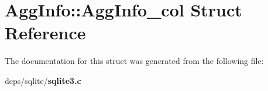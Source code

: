 \section{Agg\-Info::Agg\-Info\_\-col Struct Reference}
\label{structAggInfo_1_1AggInfo__col}


The documentation for this struct was generated from the following file:\begin{CompactItemize}
\item 
deps/sqlite/\bf{sqlite3.c}\end{CompactItemize}
